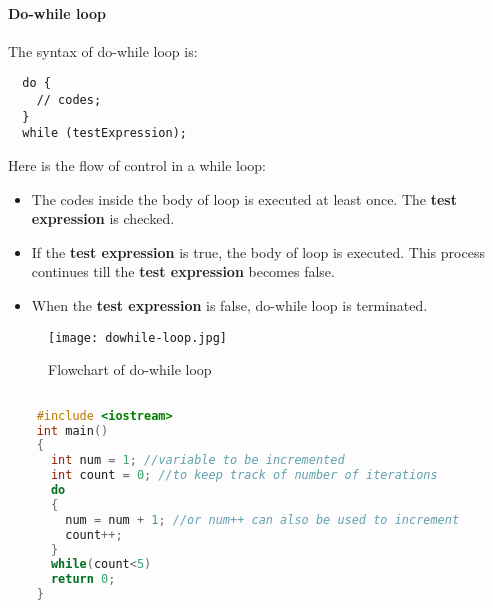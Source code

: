 \documentclass[11pt,fleqn]{book} %
\begin{document}
\paragraph{Do-while loop}
The syntax of do-while loop is:
\begin{lstlisting}
  do {
    // codes;
  }
  while (testExpression);
\end{lstlisting}
Here is the flow of control in a while loop:
\begin{itemize}
\item The codes inside the body of loop is executed at least once. The \textbf{test expression} is checked.
\item If the \textbf{test expression} is true, the body of loop is executed. This process continues till the \textbf{test expression} becomes false.
\item When the \textbf{test expression} is false, do-while loop is terminated.
\end{itemize}
\begin{figure}[H]
  \centering
  \texttt{[image: dowhile-loop.jpg]}
  \caption{Flowchart of do-while loop}
\end{figure}
\begin{example}
  \begin{lstlisting}[language=C++, caption = Using Do-While loop to increment an integer 5 times]
    
    #include <iostream>
    int main()
    {
      int num = 1; //variable to be incremented
      int count = 0; //to keep track of number of iterations
      do
      {
        num = num + 1; //or num++ can also be used to increment
        count++;
      }
      while(count<5)
      return 0;
    }
  \end{lstlisting}
\end{example}
\end{document}
